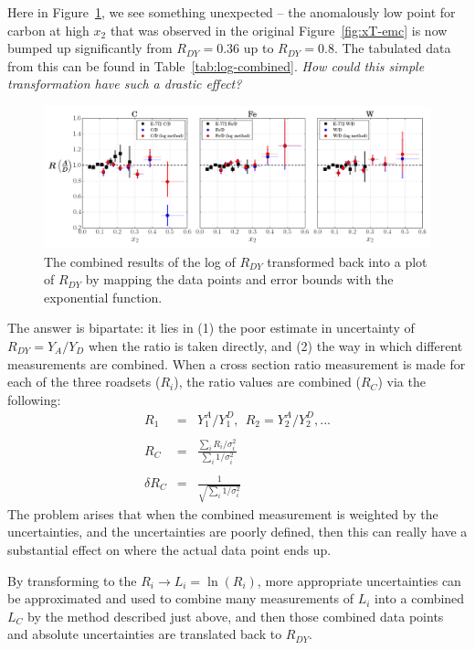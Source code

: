 Here in Figure~\ref{fig:xt-emc-nonlog}, we see something unexpected -- the anomalously low point for carbon at high $x_2$ that was observed in the original Figure~\ref{fig:xT-emc} is now bumped up significantly from $R_{DY}=0.36$ up to $R_{DY}=0.8$. The tabulated data from this can be found in Table~\ref{tab:log-combined}. \emph{How could this simple transformation have such a drastic effect?}

\begin{figure}
	\centering
	\includegraphics[width=\textwidth]{figures/results/xt-emc-nonlog-vs-old.png}
	\caption{The combined results of the log of $R_{DY}$ transformed back into a plot of $R_{DY}$ by mapping the data points and error bounds with the exponential function.}
	\label{fig:xt-emc-nonlog}
\end{figure}

The answer is bipartate: it lies in (1) the poor estimate in uncertainty of $R_{DY}=Y_A/Y_D$ when the ratio is taken directly, and (2) the way in which different measurements are combined. When a cross section ratio measurement is made for each of the three roadsets ($R_i$), the ratio values are combined ($R_C$) via the following:
\begin{eqnarray}
R_1 & = & Y^A_1/Y^D_1,\ \ R_2 = Y^A_2/Y^D_2, ... \\
& & \nonumber \\
R_C & = & \frac{\sum\limits_i R_i/\sigma_i^2}{\sum\limits_i 1/\sigma_i^2} \\
& & \nonumber \\
\delta R_C & = & \frac{1}{\sqrt{\sum\limits_i 1/\sigma_i^2}}
\end{eqnarray}
The problem arises that when the combined measurement is weighted by the uncertainties, and the uncertainties are poorly defined, then this can really have a substantial effect on where the actual data point ends up.

By transforming to the $R_i \rightarrow L_i = \ln(R_i)$, more appropriate uncertainties can be approximated and used to combine many measurements of $L_i$ into a combined $L_C$ by the method described just above, and then those combined data points and absolute uncertainties are translated back to $R_{DY}$.

